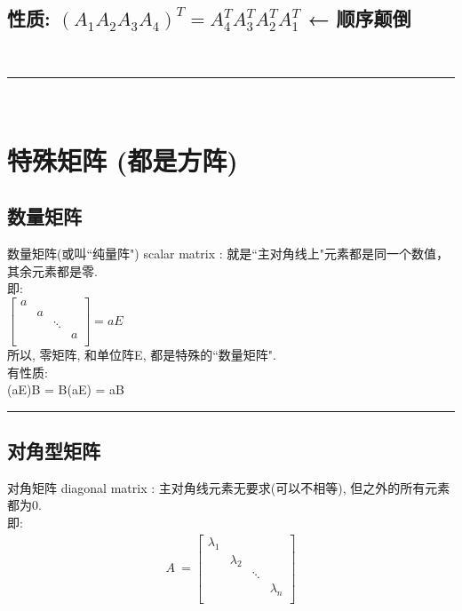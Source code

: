 \documentclass[UTF8]{ctexart}
\begin{document}
\subsection{性质: $(A_1 A_2 A_3 A_4)^T = A_4^T  A_3^T  A_2^T  A_1^T$ ← 顺序颠倒}

~\\
\hrule
~\\


\section{特殊矩阵 (都是方阵)}

\subsection{数量矩阵}

数量矩阵(或叫``纯量阵") scalar matrix : 就是``主对角线上"元素都是同一个数值，其余元素都是零. \\
即: \\
$
\left[ \begin{matrix}
	a&		&		&		\\
	&		a&		&		\\
	&		&		\ddots&		\\
	&		&		&		a\\
\end{matrix} \right]  
= aE
$\\

所以, 零矩阵, 和单位阵E, 都是特殊的``数量矩阵". \\

有性质: \\
(aE)B = B(aE) = aB \\


\hrule


\subsection{对角型矩阵}

对角矩阵 diagonal matrix : 主对角线元素无要求(可以不相等), 但之外的所有元素都为0.\\

即: 
\begin{align}
	A\ =\left[ \begin{matrix}
		\lambda _1&		&		&		\\
		&		\lambda _2&		&		\\
		&		&		\ddots&		\\
		&		&		&		\lambda _n\\
	\end{matrix} \right]
\end{align}
\end{document}

